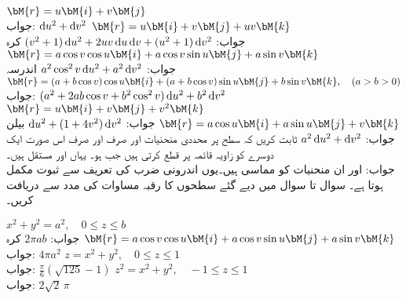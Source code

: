 \quad 
$\bM{r}=u\bM{i}+v\bM{j}$\\
جواب:\quad
$\dif u^2+\dif v^2$
\quad 
$\bM{r}=u\bM{i}+v\bM{j}+uv\bM{k}$\\
جواب:\quad
$(v^2+1)\dif u^2+2uv\dif u\dif v+(u^2+1)\dif v^2$
\quad  کرہ \quad
$\bM{r}=a\cos v \cos u\bM{i}+a\cos v \sin u\bM{j}+a\sin v\bM{k}$\\
جواب:\quad
$a^2\cos^2 v\dif u^2+a^2\dif v^2$
\quad  اندرسہ\quad
$\bM{r}=(a+b\cos v) \cos u\bM{i}+(a+b\cos v) \sin u\bM{j}+b\sin v\bM{k},\quad (a>b>0)$\\
جواب:\quad
$(a^2+2ab\cos v+b^2\cos^2 v)\dif u^2+b^2\dif v^2$
\quad 
$\bM{r}=u\bM{i}+v\bM{j}+v^2\bM{k}$\\
جواب:\quad
$\dif u^2+(1+4v^2)\dif v^2$
\quad  بیلن \quad
$\bM{r}=a\cos u\bM{i}+a\sin u\bM{j}+v\bM{k}$\\
جواب:\quad
$a^2\dif u^2+\dif v^2$
\quad ثابت کریں کہ سطح  پر محددی منحنیات  اور  صرف اور صرف اس صورت ایک دوسرے کو زاویہ قائمہ پر قطع کرتی ہیں جب  ہو۔  یہاں  اور  مستقل ہیں۔\\
جواب:\quad {} اور  ان منحنیات کو مماسی ہیں۔یوں اندرونی ضرب کی تعریف  سے ثبوت مکمل ہوتا ہے۔
سوال  تا سوال  میں دیے گئے سطحوں کا رقبہ مساوات  کی مدد سے دریافت کریں۔

\quad
$x^2+y^2=a^2,\quad 0\le z\le b$\\
جواب:\quad
$2\pi ab$
\quad کرہ \quad
$\bM{r}=a\cos v \cos u\bM{i}+a\cos v \sin u\bM{j}+a\sin v\bM{k}$\\
جواب:\quad
$4\pi a^2$
\quad 
$z=x^2+y^2,\quad 0\le z\le 1$\\
جواب:\quad
$\tfrac{\pi}{6}(\sqrt{125}-1)$
\quad 
$z^2=x^2+y^2,\quad -1\le z\le 1$\\
جواب:\quad
$2\sqrt{2}\,\pi$

